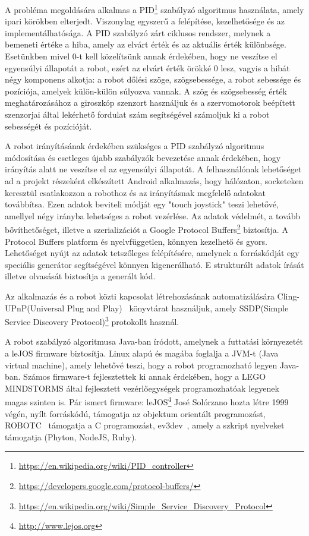 A probléma megoldására alkalmas a PID\footnote{\href{https://en.wikipedia.org/wiki/PID\_controller}{https://en.wikipedia.org/wiki/PID\_controller}} szabályzó algoritmus használata, amely ipari körökben elterjedt. Viszonylag egyszerű a felépítése, kezelhetősége és az implementálhatósága. A PID szabályzó zárt ciklusos rendszer, melynek a bemeneti értéke a hiba, amely az elvárt érték és az aktuális érték különbsége. Esetünkben mivel 0-t kell közelítsünk annak érdekében, hogy ne veszítse el egyensúlyi állapotát a robot, ezért az elvárt érték örökké 0 lesz, vagyis a hibát négy komponens alkotja: a robot dőlési szöge, szögsebessége, a robot sebessége és pozíciója, amelyek külön-külön súlyozva vannak. A szög és szögsebesség érték meghatározásához a giroszkóp szenzort használjuk és a szervomotorok beépített szenzorjai által lekérhető fordulat szám segítségével számoljuk ki a robot sebességét és pozícióját.

A robot irányításának érdekében szükséges a PID szabályzó algoritmus módosítása és esetleges újabb szabályzók bevezetése annak érdekében, hogy irányítás alatt ne veszítse el az egyensúlyi állapotát. A felhasználónak lehetőséget ad a projekt részeként elkészített Android alkalmazás, hogy hálózaton, socketeken keresztül csatlakozzon a robothoz és az irányításnak megfelelő adatokat továbbítsa. Ezen adatok beviteli módját egy "touch joystick" teszi lehetővé, amellyel négy irányba lehetséges a robot vezérlése. Az adatok védelmét, a tovább bővíthetőséget, illetve a szerializációt a Google Protocol Buffers\footnote{\href {https://developers.google.com/protocol-buffers/}{https://developers.google.com/protocol-buffers/}} biztosítja. A Protocol Buffers platform és nyelvfüggetlen, könnyen kezelhető és gyors. Lehetőséget nyújt az adatok tetszőleges felépítésére, amelynek a forráskódját egy speciális generátor segítségével könnyen kigenerálható. E strukturált adatok írását illetve olvasását biztosítja a generált kód.

Az alkalmazás és a robot közti kapcsolat létrehozásának automatizálására Cling-UPnP(Universal Plug and Play)~\cite{upnp} könyvtárat használjuk, amely SSDP(Simple Service Discovery Protocol)\footnote{\href{https://en.wikipedia.org/wiki/Simple\_Service\_Discovery\_Protocol}{https://en.wikipedia.org/wiki/Simple\_Service\_Discovery\_Protocol}} protokollt használ.

A robot szabályzó algoritmusa Java-ban íródott, amelynek a futtatási környezetét a leJOS firmware biztosítja. Linux alapú  és magába foglalja a JVM-t (Java virtual machine), amely lehetővé teszi, hogy a robot programozható legyen Java-ban. Számos firmware-t fejlesztettek ki annak érdekében, hogy a LEGO MINDSTORMS által fejlesztett vezérlőegységek programozhatóak legyenek magas szinten is. Pár ismert firmware: leJOS\footnote{\href{http://www.lejos.org}{http://www.lejos.org}} José Solórzano hozta létre 1999 végén, nyílt forráskódú, támogatja az objektum orientált programozást, ROBOTC~\cite{robotc} támogatja a C programozást, ev3dev~\cite{ev3dev}, amely a szkript nyelveket támogatja (Phyton, NodeJS, Ruby). 

